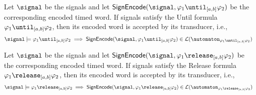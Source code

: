 

\begin{proposition} 
\label{propo3}
    Let $\signal$ be the signals and let $\textsf{SignEncode}(\signal,\varphi_1\until_{[a,b]}\varphi_2)$ be the corresponding encoded timed word. If signals  satisfy the Until formula $ \varphi_1\until_{[a,b]}\varphi_2$, then its encoded word is accepted by its transducer, i.e., 
    \begin{align*}
        \signal \models \varphi_1\until_{[a,b]}\varphi_2 \implies \textsf{SignEncode}(\signal,\varphi_1\until_{[a,b]}\varphi_2) \in 
        \mathcal{L}(\automaton_{\varphi_1\until_{[a,b]}\varphi_2}) 
    \end{align*}
\end{proposition}

\begin{proposition} 
\label{propo4}
    Let $\signal$ be the signals and let $\textsf{SignEncode}(\signal,\varphi_1\release_{[a,b]}\varphi_2)$ be the corresponding encoded timed word. If signals  satisfy the Release formula $ \varphi_1\release_{[a,b]}\varphi_2$, then its encoded word is accepted by its transducer, i.e., 
    \begin{align*}
        \signal \models \varphi_1\release_{[a,b]}\varphi_2 \implies \textsf{SignEncode}(\signal,\varphi_1\release_{[a,b]}\varphi_2) \in 
        \mathcal{L}(\automaton_{\varphi_1\release_{[a,b]}\varphi_2}) 
    \end{align*}
\end{proposition}




